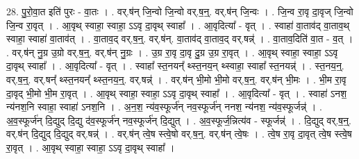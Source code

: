 \documentclass[17pt]{extarticle}
\begin{document}
28. पु॒रो॒वा॒त इति॑ पुरः - वा॒तः । . वर्.ष॑न् जि॒न्वो जि॒न्वो वर्.ष॒न्॒. वर्.ष॑न् जि॒न्वः । . जि॒न्व रा॒वृ दा॒वृज् जि॒न्वो जि॒न्व रा॒वृत् । . आ॒वृथ् स्वाहा॒ स्वाहा॒ ऽऽवृ दा॒वृथ् स्वाहा᳚ । . आ॒वृदित्या᳚ - वृत् । . स्वाहा॑ वा॒ताव॑द् वा॒ताव॒थ् स्वाहा॒ स्वाहा॑ वा॒ताव॑त् । . वा॒ताव॒द् वर्.ष॒न्॒. वर्.ष॑न्. वा॒ताव॑द् वा॒ताव॒द् वर्.षन्न्॑ । . वा॒ताव॒दिति॑ वा॒त - व॒त् । . वर्.ष॑न् नु॒ग्र उ॒ग्रो वर्.ष॒न्॒. वर्.ष॑न् नु॒ग्रः । . उ॒ग्र रा॒वृ दा॒वृ दु॒ग्र उ॒ग्र रा॒वृत् । . आ॒वृथ् स्वाहा॒ स्वाहा॒ ऽऽवृ दा॒वृथ् स्वाहा᳚ । . आ॒वृदित्या᳚ - वृत् । . स्वाहा᳚ स्त॒नयन्᳚ थ्स्त॒नय॒न् थ्स्वाहा॒ स्वाहा᳚ स्त॒नयन्न्॑ । . स्त॒नय॒न्॒. वर्.ष॒न्॒. वर्.षन्᳚ थ्स्त॒नयन्᳚ थ्स्त॒नय॒न्॒. वर्.षन्न्॑ । . वर्.ष॑न् भी॒मो भी॒मो वर्.ष॒न्॒. वर्.ष॑न् भी॒मः । . भी॒म रा॒वृ दा॒वृद् भी॒मो भी॒म रा॒वृत् । . आ॒वृथ् स्वाहा॒ स्वाहा॒ ऽऽवृ दा॒वृथ् स्वाहा᳚ । . आ॒वृदित्या᳚ - वृत् । . स्वाहा॑ ऽनश॒ न्य॑नश॒नि स्वाहा॒ स्वाहा॑ ऽनश॒नि । . अ॒न॒श॒ न्य॑व॒स्फूर्ज॑न् नव॒स्फूर्ज॑न् ननश॒ न्य॑नश॒ न्य॑व॒स्फूर्जन्न्॑ । . अ॒व॒स्फूर्ज॑न् दि॒द्युद् दि॒द्यु द॑व॒स्फूर्ज॑न् नव॒स्फूर्ज॑न् दि॒द्युत् । . अ॒व॒स्फूर्ज॒न्नित्य॑व - स्फूर्जन्न्॑ । . दि॒द्युद् वर्.ष॒न्॒. वर्.ष॑न् दि॒द्युद् दि॒द्युद् वर्.षन्न्॑ । . वर्.ष॑न् त्वे॒ष स्त्वे॒षो वर्.ष॒न्॒. वर्.ष॑न् त्वे॒षः । . त्वे॒ष रा॒वृ दा॒वृत् त्वे॒ष स्त्वे॒ष रा॒वृत् । . आ॒वृथ् स्वाहा॒ स्वाहा॒ ऽऽवृ दा॒वृथ् स्वाहा᳚ । \newline
\end{document}
